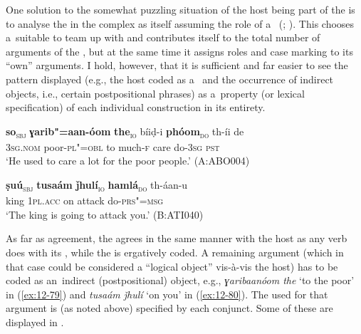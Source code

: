 One solution to the somewhat puzzling situation of the host being part of the  is to analyse the  in the complex as itself assuming the role of a~ (\citealt[204--212]{verma1993}; \citealt[164--170]{mohanan1993}). This  chooses a~suitable  to team up with and contributes itself to the total number of arguments of the , but at the same time it assigns roles and case marking to its ``own'' arguments. I hold, however, that it is sufficient and far easier to see the  pattern displayed (e.g., the host coded as a~ and the occurrence of indirect objects, i.e., certain postpositional phrases) as a~property (or lexical specification) of each individual construction in its entirety. 

\begin{exe}
\ex
\label{ex:12-79}
\gll {\ob}\textbf{so}{\cb}\textsubscript{\textsc{\upshape sbj}} {\ob}\textbf{ɣarib"=aan-óom} \textbf{the}{\cb}\textsubscript{\textsc{\upshape io}} bíiḍ-i {\ob}\textbf{phóom}{\cb}\textsubscript{\textsc{\upshape do}} th-íi de\\
\textsc{3sg.nom} poor-\textsc{pl"=obl} to much-\textsc{f} care do-\textsc{3sg}  \textsc{pst} \\
\glt `He used to care a lot for the poor people.' (A:ABO004)
\end{exe}
\begin{exe}
\ex
\label{ex:12-80}
\gll {\ob}\textbf{ṣuú}{\cb}\textsubscript{\textsc{\upshape sbj}} {\ob}\textbf{tusaám} \textbf{ǰhulí}{\cb}\textsubscript{\textsc{\upshape io}} {\ob}\textbf{hamlá}{\cb}\textsubscript{\textsc{\upshape do}} th-áan-u\\
king \textsc{1pl.acc} on attack do-\textsc{prs"=msg}\\
\glt `The king is going to attack you.' (B:ATI040)
\end{exe}

As far as  agreement, the  agrees in the same manner with the host as any  verb does with its , while the  is ergatively coded. A remaining argument (which in that case could be considered a ``logical object'' vis-à-vis the host) has to be coded as an~indirect (postpositional) object, e.g., \textit{ɣaribaanóom the} `to the poor' in (\ref{ex:12-79}) and \textit{tusaám ǰhulí} `on you' in (\ref{ex:12-80}). The  used for that argument is (as noted above) specified by each conjunct. Some of these are displayed in .


